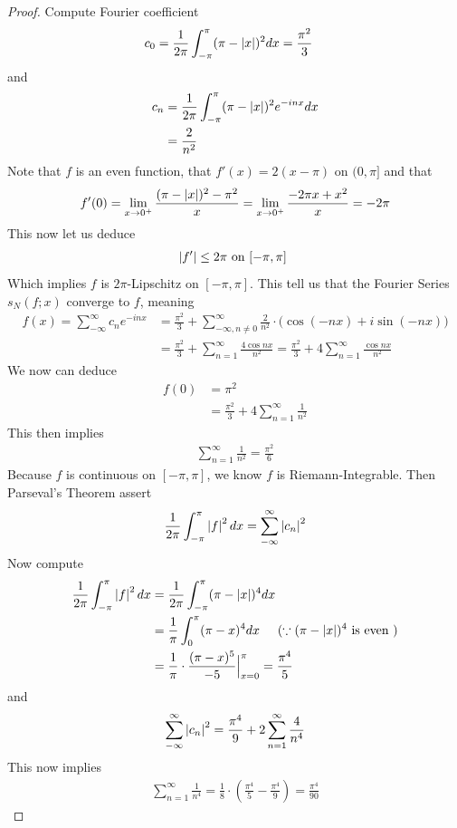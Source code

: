 \documentclass{report}
\begin{document}
\begin{proof}
Compute Fourier coefficient 
\begin{align*}
c_0&=\frac{1}{2\pi}\int_{-\pi}^\pi (\pi - \left|x\right|)^2dx=\frac{\pi^2}{3}
\end{align*}
and 
\begin{align*}
c_n&=\frac{1}{2\pi}\int_{-\pi}^\pi (\pi -\left|x\right|)^2 e^{-inx}dx\\
&=\frac{2}{n^2}
\end{align*}
Note that $f$ is an even function, that  $f'(x)=2(x-\pi)$ on $(0,\pi ]$ and that 
\begin{align*}
f'(0)=\lim_{x\to 0^+} \frac{(\pi - \left|x\right|)^2 - \pi^2}{x}=\lim_{x\to 0^+} \frac{-2\pi x +x^2}{x}=-2\pi 
\end{align*}
This now let us deduce 
\begin{align*}
\left|f'\right|\leq  2\pi \text{ on $[-\pi , \pi]$ }
\end{align*}
Which implies $f$ is  $2\pi$-Lipschitz on $[-\pi , \pi ]$. This tell us that the Fourier Series $s_N(f;x)$ converge to $f$, meaning 
\begin{align*}
f(x)=\sum_{-\infty}^\infty c_ne^{-i nx}&=\frac{\pi^2}{3}+\sum_{-\infty, n\neq 0}^\infty \frac{2}{n^2}\cdot \big(\cos (-nx)+ i \sin (-nx) \big)\\
&=\frac{\pi^2}{3}+\sum_{n=1}^\infty \frac{4 \cos nx}{n^2}=\frac{\pi^2}{3}+4\sum_{n=1}^\infty \frac{\cos nx}{n^2}
\end{align*}
We now can deduce
\begin{align*}
f(0)&=\pi^2\\
&=\frac{\pi^2}{3}+4 \sum_{n=1}^\infty \frac{1}{n^2}
\end{align*}
This then implies  
\begin{align*}
\sum_{n=1}^\infty \frac{1}{n^2}=\frac{\pi^2}{6}
\end{align*}
Because $f$ is continuous on $[-\pi , \pi]$, we know $f$ is Riemann-Integrable. Then Parseval's Theorem assert 
\begin{align*}
\frac{1}{2\pi} \int_{-\pi}^{\pi} \left|f\right|^2 dx= \sum_{-\infty}^\infty \left|c_n\right|^2
\end{align*}
Now compute 
\begin{align*}
\frac{1}{2\pi} \int_{-\pi }^\pi \left|f\right|^2dx&=\frac{1}{2\pi}\int_{-\pi}^{\pi} (\pi - \left|x\right|)^4dx\\
&=\frac{1}{\pi}\int_0^\pi (\pi -x)^4 dx\hspace{0.5cm}(\because (\pi -\left|x\right|)^4 \text{ is even })\\
&=\frac{1}{\pi} \cdot \frac{(\pi -x )^5}{-5}\Big|_{x=0}^\pi= \frac{\pi^4}{5}
\end{align*}
and 
\begin{align*}
\sum_{-\infty}^\infty \left|c_n\right|^2= \frac{\pi^4}{9}+ 2\sum_{n=1}^\infty \frac{4}{n^4}
\end{align*}
This now implies 
\begin{align*}
\sum_{n=1}^\infty \frac{1}{n^4}= \frac{1}{8}\cdot (\frac{\pi^4}{5}-\frac{\pi^4}{9})=\frac{\pi^4}{90}
\end{align*}
\end{proof}
\end{document}

